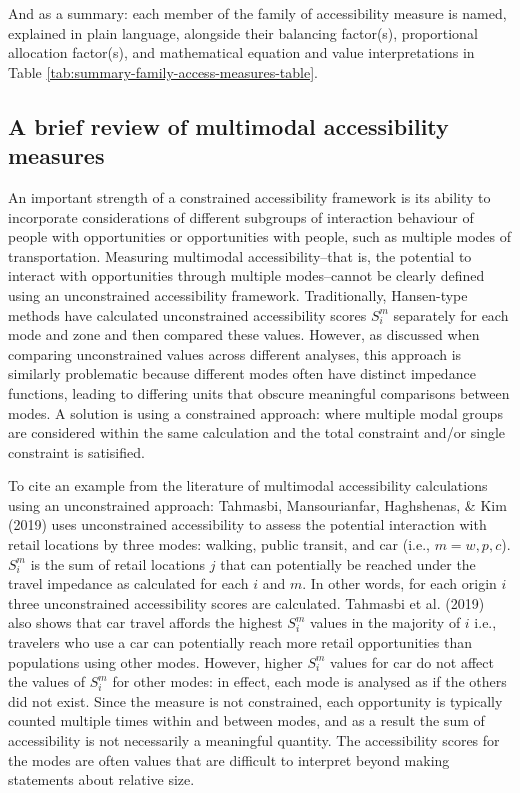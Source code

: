 \documentclass[
11pt, %
oneside, %
english, %
singlespacing, %
]{macthesis} %
\begin{document}
And as a summary: each member of the family of accessibility measure is named, explained in plain language, alongside their balancing factor(s), proportional allocation factor(s), and mathematical equation and value interpretations in Table \ref{tab:summary-family-access-measures-table}.



\subsection{A brief review of multimodal accessibility measures}\label{a-brief-review-of-multimodal-accessibility-measures}

An important strength of a constrained accessibility framework is its ability to incorporate considerations of different subgroups of interaction behaviour of people with opportunities or opportunities with people, such as multiple modes of transportation. Measuring multimodal accessibility--that is, the potential to interact with opportunities through multiple modes--cannot be clearly defined using an unconstrained accessibility framework. Traditionally, Hansen-type methods have calculated unconstrained accessibility scores \(S_i^m\) separately for each mode and zone and then compared these values. However, as discussed when comparing unconstrained values across different analyses, this approach is similarly problematic because different modes often have distinct impedance functions, leading to differing units that obscure meaningful comparisons between modes. A solution is using a constrained approach: where multiple modal groups are considered within the same calculation and the total constraint and/or single constraint is satisified.

To cite an example from the literature of multimodal accessibility calculations using an unconstrained approach: Tahmasbi, Mansourianfar, Haghshenas, \& Kim (2019) uses unconstrained accessibility to assess the potential interaction with retail locations by three modes: walking, public transit, and car (i.e., \(m = w, p, c\)). \(S_i^m\) is the sum of retail locations \(j\) that can potentially be reached under the travel impedance as calculated for each \(i\) and \(m\). In other words, for each origin \(i\) three unconstrained accessibility scores are calculated. Tahmasbi et al. (2019) also shows that car travel affords the highest \(S_i^{m}\) values in the majority of \(i\) i.e., travelers who use a car can potentially reach more retail opportunities than populations using other modes. However, higher \(S_i^{m}\) values for car do not affect the values of \(S_i^{m}\) for other modes: in effect, each mode is analysed as if the others did not exist. Since the measure is not constrained, each opportunity is typically counted multiple times within and between modes, and as a result the sum of accessibility is not necessarily a meaningful quantity. The accessibility scores for the modes are often values that are difficult to interpret beyond making statements about relative size.
\end{document}
